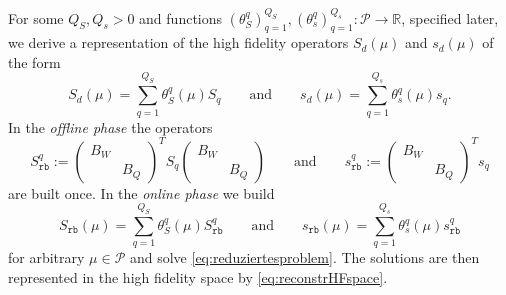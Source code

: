 \documentclass{article}
\theoremstyle{plain}
\theoremstyle{definition}
\theoremstyle{remark}
\begin{document}
For some $Q_S, Q_s > 0$ and functions $(\theta_S^q)_{q=1}^{Q_S}, (\theta_s^q)_{q=1}^{Q_s} : \mathcal{P} \rightarrow \mathbb{R}$, specified later, we derive a representation of the high fidelity operators $S_d(\mu)$ and $s_d(\mu)$ of the form
\begin{equation}
    S_d(\mu) = \sum_{q=1}^{Q_S} \theta_S^q(\mu) S_q \qquad \text{and} \qquad s_d(\mu) = \sum_{q=1}^{Q_s} \theta_s^q(\mu) s_q .
\end{equation}
In the \textit{offline phase} the operators 
\begin{equation}
    S_\texttt{rb}^q := \begin{pmatrix}B_W & \\ & B_Q\end{pmatrix}^T S_q \begin{pmatrix}B_W & \\ & B_Q\end{pmatrix} \qquad \text{and} \qquad s_\texttt{rb}^q := \begin{pmatrix}B_W & \\ & B_Q\end{pmatrix}^T s_q
\end{equation}
are built once. In the \textit{online phase} we build 
\begin{equation}
    S_\texttt{rb}(\mu) = \sum_{q=1}^{Q_S} \theta^q_S(\mu) S_\texttt{rb}^q \qquad \text{and} \qquad s_\texttt{rb}(\mu) = \sum_{q=1}^{Q_s} \theta^q_s(\mu) s_\texttt{rb}^q
\end{equation}
for arbitrary $\mu \in \mathcal{P}$ and solve \eqref{eq:reduziertesproblem}. The solutions are then represented in the high fidelity space by \eqref{eq:reconstrHFspace}. 
\end{document}
